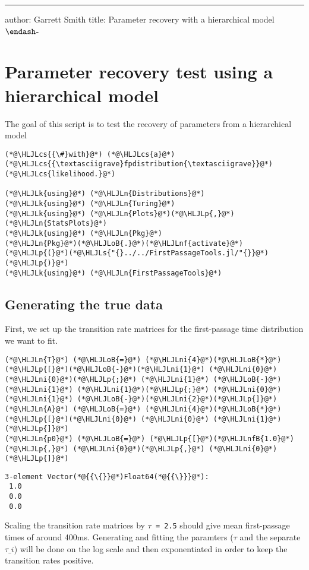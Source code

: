 \documentclass[12pt,a4paper]{article}
\newcommand{\HLJLk}[1]{\textcolor[RGB]{148,91,176}{\textbf{#1}}}
\newcommand{\HLJLn}[1]{#1}
\newcommand{\HLJLnf}[1]{\textcolor[RGB]{66,102,213}{#1}}
\newcommand{\HLJLs}[1]{\textcolor[RGB]{201,61,57}{#1}}
\newcommand{\HLJLnfB}[1]{\textcolor[RGB]{59,151,46}{#1}}
\newcommand{\HLJLni}[1]{\textcolor[RGB]{59,151,46}{#1}}
\newcommand{\HLJLoB}[1]{\textcolor[RGB]{102,102,102}{\textbf{#1}}}
\newcommand{\HLJLp}[1]{#1}
\newcommand{\HLJLcs}[1]{\textcolor[RGB]{153,153,119}{\textit{#1}}}
\begin{document}
\rule{\textwidth}{1pt}
author: Garrett Smith title: Parameter recovery with a hierarchical model \ensuremath{\endash}-

\section{Parameter recovery test using a hierarchical model}
The goal of this script is to test the recovery of parameters from a hierarchical model


\begin{lstlisting}
(*@\HLJLcs{{\#}with}@*) (*@\HLJLcs{a}@*) (*@\HLJLcs{{\textasciigrave}fpdistribution{\textasciigrave}}@*) (*@\HLJLcs{likelihood.}@*)

(*@\HLJLk{using}@*) (*@\HLJLn{Distributions}@*)
(*@\HLJLk{using}@*) (*@\HLJLn{Turing}@*)
(*@\HLJLk{using}@*) (*@\HLJLn{Plots}@*)(*@\HLJLp{,}@*) (*@\HLJLn{StatsPlots}@*)
(*@\HLJLk{using}@*) (*@\HLJLn{Pkg}@*)
(*@\HLJLn{Pkg}@*)(*@\HLJLoB{.}@*)(*@\HLJLnf{activate}@*)(*@\HLJLp{(}@*)(*@\HLJLs{"{}../../FirstPassageTools.jl/"{}}@*)(*@\HLJLp{)}@*)
(*@\HLJLk{using}@*) (*@\HLJLn{FirstPassageTools}@*)
\end{lstlisting}


\subsection{Generating the true data}
First, we set up the transition rate matrices for the first-passage time distribution we want to fit.


\begin{lstlisting}
(*@\HLJLn{T}@*) (*@\HLJLoB{=}@*) (*@\HLJLni{4}@*)(*@\HLJLoB{*}@*)(*@\HLJLp{[}@*)(*@\HLJLoB{-}@*)(*@\HLJLni{1}@*) (*@\HLJLni{0}@*) (*@\HLJLni{0}@*)(*@\HLJLp{;}@*) (*@\HLJLni{1}@*) (*@\HLJLoB{-}@*)(*@\HLJLni{1}@*) (*@\HLJLni{1}@*)(*@\HLJLp{;}@*) (*@\HLJLni{0}@*) (*@\HLJLni{1}@*) (*@\HLJLoB{-}@*)(*@\HLJLni{2}@*)(*@\HLJLp{]}@*)
(*@\HLJLn{A}@*) (*@\HLJLoB{=}@*) (*@\HLJLni{4}@*)(*@\HLJLoB{*}@*)(*@\HLJLp{[}@*)(*@\HLJLni{0}@*) (*@\HLJLni{0}@*) (*@\HLJLni{1}@*)(*@\HLJLp{]}@*)
(*@\HLJLn{p0}@*) (*@\HLJLoB{=}@*) (*@\HLJLp{[}@*)(*@\HLJLnfB{1.0}@*)(*@\HLJLp{,}@*) (*@\HLJLni{0}@*)(*@\HLJLp{,}@*) (*@\HLJLni{0}@*)(*@\HLJLp{]}@*)
\end{lstlisting}

\begin{lstlisting}
3-element Vector(*@{{\{}}@*)Float64(*@{{\}}}@*):
 1.0
 0.0
 0.0
\end{lstlisting}


Scaling the transition rate matrices by \texttt{\ensuremath{\tau} = 2.5} should give mean first-passage times of around 400ms. Generating and fitting the paramters (\ensuremath{\tau} and the separate \ensuremath{\tau}\ensuremath{\_i}) will be done on the log scale and then exponentiated in order to keep the transition rates positive.
\end{document}
